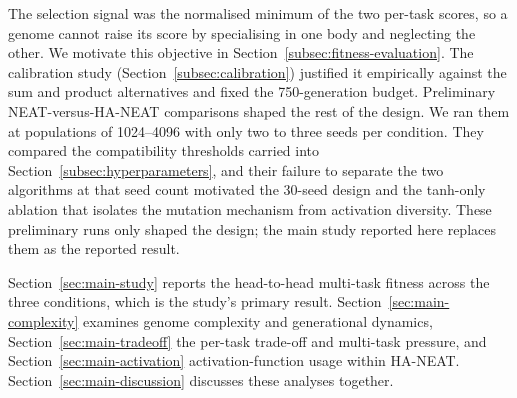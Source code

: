\documentclass[12pt]{article}
\newcommand{\revBrit}[2]{#2}
\newcommand{\revNota}[2]{#2}
\begin{document}
The selection signal was the normalised minimum of the two per-task scores\revNota{N-06}{}, so a genome cannot raise its score by \revBrit{E-11}{specialising} in one body and neglecting the other.
We motivate this objective in Section~\ref{subsec:fitness-evaluation}. The calibration study (Section~\ref{subsec:calibration}) justified it empirically against the sum and product alternatives and fixed the 750-generation budget.
Preliminary NEAT-versus-HA-NEAT comparisons shaped the rest of the design. We ran them at populations of 1024--4096 with only two to three seeds per condition. They compared the compatibility thresholds carried into Section~\ref{subsec:hyperparameters}, and their failure to separate the two algorithms at that seed count motivated the 30-seed design and the tanh-only ablation that isolates the mutation mechanism from activation diversity. These preliminary runs only shaped the design; the main study reported here replaces them as the reported result.

Section~\ref{sec:main-study} reports the head-to-head multi-task fitness across the three conditions, which is the study's primary result.
Section~\ref{sec:main-complexity} examines genome complexity and generational dynamics, Section~\ref{sec:main-tradeoff} the per-task trade-off and multi-task pressure, and Section~\ref{sec:main-activation} activation-function usage within HA-NEAT.
Section~\ref{sec:main-discussion} discusses these analyses together.
\end{document}
